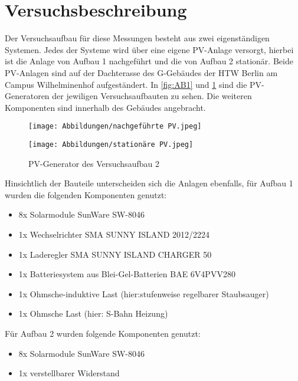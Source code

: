 \section{Versuchsbeschreibung}
\label{section:Versuchsbeschreibung}
Der Versuchsaufbau für diese Messungen besteht aus zwei eigenständigen Systemen.
Jedes der Systeme wird über eine eigene PV-Anlage versorgt, hierbei ist die Anlage
von Aufbau 1 nachgeführt und die von Aufbau 2 stationär. Beide PV-Anlagen sind auf
der Dachterasse des G-Gebäudes der HTW Berlin am Campus Wilhelminenhof aufgeständert.
In \ref*{fig:AB1} und \ref*{fig:AB2} sind die PV-Generatoren der jewiligen Versuchsaufbauten 
zu sehen. Die weiteren Komponenten sind innerhalb des Gebäudes angebracht.\\
%
\begin{figure}[H]
	\centering
	\begin{minipage}{0.49\textwidth}
		\centering
		\texttt{[image: Abbildungen/nachgeführte PV.jpeg]}
		\caption{PV-Generator des Versuchsaufbau 1}	
		\label{fig:AB1}
	\end{minipage}
	\hfill
\begin{minipage}{0.49\textwidth}
	\centering
	\texttt{[image: Abbildungen/stationäre PV.jpeg]}
	\caption{PV-Generator des Versuchsaufbau 2}
	\label{fig:AB2}
\end{minipage}
\end{figure}
%
Hinsichtlich der Bauteile unterscheiden sich die Anlagen ebenfalls, für Aufbau 1 
wurden die folgenden Komponenten genutzt:
\begin{itemize}
	\item 8x Solarmodule SunWare SW-8046 
	\item 1x Wechselrichter SMA SUNNY ISLAND 2012/2224 
	\item 1x Laderegler SMA SUNNY ISLAND CHARGER 50 
	\item 1x Batteriesystem aus Blei-Gel-Batterien BAE 6V4PVV280
	\item 1x Ohmsche-induktive Last (hier:stufenweise regelbarer Staubsauger)
	\item 1x Ohmsche Last (hier: S-Bahn Heizung)
\end{itemize}

Für Aufbau 2 wurden folgende Komponenten genutzt:
\begin{itemize}
	\item 8x Solarmodule SunWare SW-8046 
	\item 1x verstellbarer Widerstand
\end{itemize}
